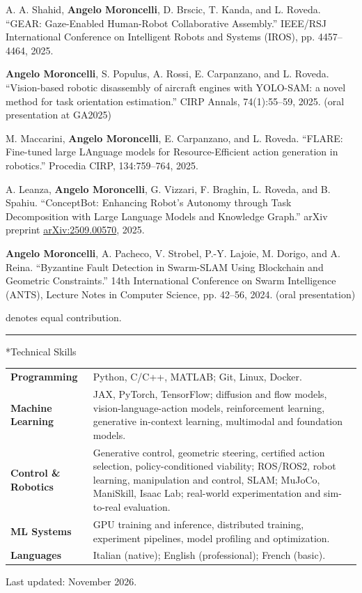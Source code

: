 \documentclass[10pt,a4paper]{article}
\makeatletter
\renewcommand{\section}{\@ifstar\cvsection\cvsection}
\newcommand{\cvsection}[1]{\par\addvspace{9pt}{\large\bfseries #1\par}\nobreak\vspace{4pt}\hrule\nobreak\vspace{5pt}}
\makeatother
\begin{document}
\begin{enumerate}[label={[\arabic*]},leftmargin=1.5em,itemsep=4pt,topsep=3pt]
\item A. A. Shahid, \textbf{Angelo Moroncelli}, D. Brscic, T. Kanda, and L. Roveda. “GEAR: Gaze-Enabled Human-Robot Collaborative Assembly.” IEEE/RSJ International Conference on Intelligent Robots and Systems (IROS), pp. 4457–4464, 2025.
\item \textbf{Angelo Moroncelli}, S. Populus, A. Rossi, E. Carpanzano, and L. Roveda. “Vision-based robotic disassembly of aircraft engines with YOLO-SAM: a novel method for task orientation estimation.” CIRP Annals, 74(1):55–59, 2025. (oral presentation at GA2025)
\item M. Maccarini, \textbf{Angelo Moroncelli}, E. Carpanzano, and L. Roveda. “FLARE: Fine-tuned large LAnguage models for Resource-Efficient action generation in robotics.” Procedia CIRP, 134:759–764, 2025.
\item A. Leanza, \textbf{Angelo Moroncelli}, G. Vizzari, F. Braghin, L. Roveda, and B. Spahiu. “ConceptBot: Enhancing Robot’s Autonomy through Task Decomposition with Large Language Models and Knowledge Graph.” arXiv preprint \href{https://arxiv.org/abs/2509.00570}{arXiv:2509.00570}, 2025.
\item \textbf{Angelo Moroncelli}, A. Pacheco, V. Strobel, P.-Y. Lajoie, M. Dorigo, and A. Reina. “Byzantine Fault Detection in Swarm-SLAM Using Blockchain and Geometric Constraints.” 14th International Conference on Swarm Intelligence (ANTS), Lecture Notes in Computer Science, pp. 42–56, 2024. (oral presentation)
\end{enumerate}
{\footnotesize * denotes equal contribution.}

\section*{Technical Skills}
\begin{tabularx}{\textwidth}{@{}>{\raggedright\arraybackslash}p{}@{\hspace{8pt}}X@{}}
\textbf{Programming} & Python, C/C++, MATLAB; Git, Linux, Docker.\\[4pt]
\textbf{Machine Learning} & JAX, PyTorch, TensorFlow; diffusion and flow models, vision-language-action models, reinforcement learning, generative in-context learning, multimodal and foundation models.\\[4pt]
\textbf{Control \& Robotics} & Generative control, geometric steering, certified action selection, policy-conditioned viability; ROS/ROS2, robot learning, manipulation and control, SLAM; MuJoCo, ManiSkill, Isaac Lab; real-world experimentation and sim-to-real evaluation.\\[4pt]
\textbf{ML Systems} & GPU training and inference, distributed training, experiment pipelines, model profiling and optimization.\\[4pt]
\textbf{Languages} & Italian (native); English (professional); French (basic).
\end{tabularx}

\vfill
{\footnotesize Last updated: November 2026.}
\end{document}

